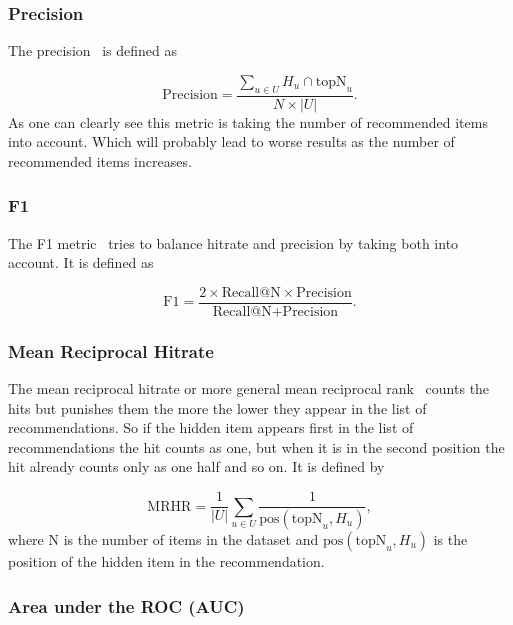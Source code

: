 \subsubsection{Precision}

The precision~\cite{Sarwar00applicationof} is defined as

\begin{equation} 
\text{Precision}=\frac{\sum_{u \in U} H_u \cap \text{topN}_u}{N \times |U|}.
\end{equation}
As one can clearly see this metric is taking the number of recommended
items into account. Which will probably lead to worse results as the
number of recommended items increases.


\subsubsection{F1}

The F1 metric~\cite{Sarwar00applicationof} tries to balance hitrate and precision
by taking both into account. It is defined as

\begin{equation}
\text{F1}=\frac{2 \times \text{Recall@N} \times \text{Precision}}{\text{Recall@N} + \text{Precision}}.
\end{equation}


\subsubsection{Mean Reciprocal Hitrate}

The mean reciprocal hitrate or more general mean reciprocal
rank~\cite{DBLP:conf/icdm/NingK11} counts the hits but punishes them the more the lower they
appear in the list of recommendations. So if the hidden item appears
first in the list of recommendations the hit counts as one, but when
it is in the second position the hit already counts only as one half
and so on. It is defined by

\begin{equation}
\text{MRHR}=\frac{1}{|U|} \sum_{u \in U} \frac{1}{\text{pos}(\text{topN}_{u},H_{u})},
\end{equation}
where N is the number of items in the dataset and \(\text{pos}(\text{topN}_{u},H_{u})\)
is the position of the hidden item in the recommendation.


\subsubsection{Area under the ROC (AUC)}

